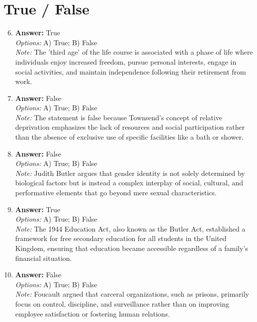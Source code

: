 \documentclass[12pt]{article}
\begin{document}
\section*{True / False}
\begin{enumerate}[label=\arabic*.]
\setcounter{enumi}{5}
\item \textbf{Answer:} True
\\ \textit{Options:} A) True; B) False
\\ \textit{Note:} The 'third age' of the life course is associated with a phase of life where individuals enjoy increased freedom, pursue personal interests, engage in social activities, and maintain independence following their retirement from work.
\item \textbf{Answer:} False
\\ \textit{Options:} A) True; B) False
\\ \textit{Note:} The statement is false because Townsend's concept of relative deprivation emphasizes the lack of resources and social participation rather than the absence of exclusive use of specific facilities like a bath or shower.
\item \textbf{Answer:} False
\\ \textit{Options:} A) True; B) False
\\ \textit{Note:} Judith Butler argues that gender identity is not solely determined by biological factors but is instead a complex interplay of social, cultural, and performative elements that go beyond mere sexual characteristics.
\item \textbf{Answer:} True
\\ \textit{Options:} A) True; B) False
\\ \textit{Note:} The 1944 Education Act, also known as the Butler Act, established a framework for free secondary education for all students in the United Kingdom, ensuring that education became accessible regardless of a family's financial situation.
\item \textbf{Answer:} False
\\ \textit{Options:} A) True; B) False
\\ \textit{Note:} Foucault argued that carceral organizations, such as prisons, primarily focus on control, discipline, and surveillance rather than on improving employee satisfaction or fostering human relations.
\end{enumerate}
\end{document}

